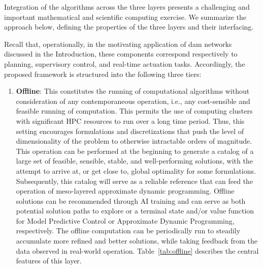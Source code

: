 \documentclass{article}
\newcommand{\1}{\mathds{1}}          %
\theoremstyle{definition}
\begin{document}
\begin{sloppypar}
Integration of the algorithms across the three layers presents a challenging and important mathematical and scientific computing exercise. We summarize the approach below, defining the properties of the three layers and their interfacing.

Recall that, operationally, in the motivating application of dam networks discussed in the Introduction, these components correspond respectively to planning, supervisory control, and real-time actuation tasks. Accordingly, the proposed framework is structured into the following three tiers:
\begin{enumerate}
    \item \textbf{Offline}: This constitutes the running of computational algorithms without consideration of any contemporaneous operation, i.e., any cost-sensible and feasible running of computation. This permits the use of computing clusters with significant HPC resources to run over a long time period. Thus, this setting encourages formulations and discretizations that push the level of dimensionality of the problem to otherwise intractable orders of magnitude. This operation can be performed at the beginning to generate a catalog of a large set of feasible, sensible, stable, and well-performing solutions, with the attempt to arrive at, or get close to, global optimality for some formulations. Subsequently, this catalog will serve as a reliable reference that can feed the operation of meso-layered approximate dynamic programming. Offline solutions can be recommended through AI training and can serve as both potential solution paths to explore or a terminal state and/or value function for Model Predictive Control or Approximate Dynamic Programming, respectively. The offline computation can be periodically run to steadily accumulate more refined and better solutions, while taking feedback from the data observed in real-world operation. Table~\ref{tab:offline} describes the central features of this layer.


\end{enumerate}
\end{sloppypar}
\end{document}
